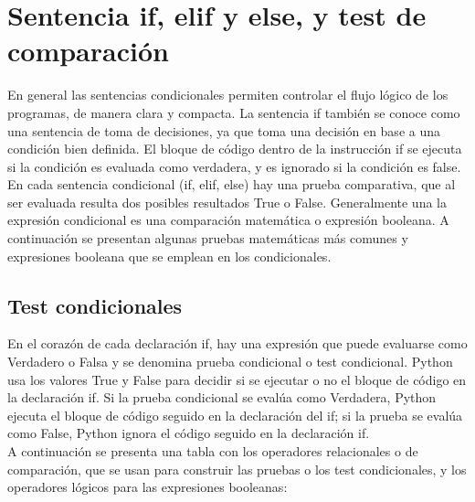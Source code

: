 \section{Sentencia if, elif y else, y test de comparación}  %


En general las sentencias condicionales  permiten controlar el flujo lógico de los programas, de manera clara y compacta. La sentencia {\ttfamily if} también se conoce como una sentencia de toma de decisiones, ya que toma una decisión en base a una condición bien definida. El bloque de código dentro de la instrucción {\ttfamily if} se ejecuta si  la condición es evaluada como verdadera, y es ignorado  si la condición es false.\\

En cada sentencia condicional ({\ttfamily if, elif, else}) hay una prueba comparativa, que al ser evaluada resulta dos posibles resultados  {\ttfamily True} o {\ttfamily False}.  Generalmente una la expresión condicional es una comparación matemática  o expresión booleana.  A continuación se presentan algunas pruebas matemáticas más comunes y expresiones booleana que se emplean en los condicionales.


\subsection{Test condicionales}

En el corazón de cada declaración {\ttfamily if}, hay una expresión que puede evaluarse como
Verdadero o Falsa y se denomina prueba condicional o test condicional. Python usa los valores {\ttfamily True} y {\ttfamily False} para decidir si se  ejecutar o no el bloque de código en la declaración {\ttfamily if}. Si la prueba condicional se evalúa como Verdadera, Python ejecuta el bloque de código seguido en la declaración del {\ttfamily if}; si la prueba se evalúa como False, Python ignora el código seguido en la declaración {\ttfamily if}.\\



A continuación se presenta una tabla con los operadores relacionales o de comparación, que se usan para construir las pruebas o los test condicionales, y los operadores lógicos para las expresiones booleanas: 



